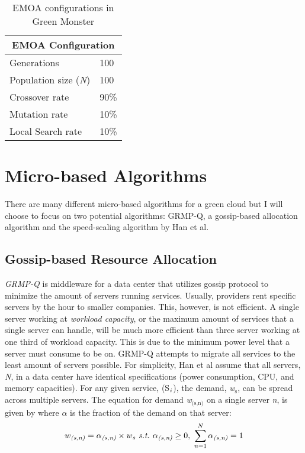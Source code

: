 \documentclass{sig-alternate}
\begin{document}
\begin{table}[tb]
\begin{center}
\begin{tabular}{|l|l|}
    \hline
    \multicolumn{2}{|c|}{\textbf{EMOA Configuration}} \\
    \hline
    Generations & 100 \\
    Population size (\emph{N}) & 100 \\
    Crossover rate & 90\% \\
    Mutation rate & 10\% \\
    Local Search rate & 10\% \\
    \hline
\end{tabular}
\caption{EMOA configurations in Green Monster}
\label{tab:EMOAConfig}
\end{center}
\end{table}



\section{Micro-based Algorithms} 
\label{sec:MicAl}

There are many different micro-based algorithms for a green cloud but I will choose to focus on two potential algorithms: GRMP-Q, a gossip-based allocation algorithm and the speed-scaling algorithm by Han et al. 

\subsection{Gossip-based Resource Allocation}
\label{sec:GBRA}
\emph{GRMP-Q} is middleware for a data center that utilizes gossip protocol to minimize the amount of servers running services. Usually, providers rent specific servers by the hour to smaller companies. This, however, is not efficient. A single server working at  \emph{workload capacity}, or the maximum amount of services that a single server can handle, will be much more efficient than three server working at one third of workload capacity. This is due to the minimum power level that a server must consume to be on. GRMP-Q attempts to migrate all services to the least amount of servers possible.  For simplicity, Han et al assume that all servers, \emph{N}, in a data center have identical specifications (power consumption, CPU, and memory capacities). For any given service, (S$_{\text{\emph{i}}}$), the demand, \emph{w$_{\text{s}}$}, can be spread across multiple servers. The equation for demand \emph{w$_{\text{(s,n)}}$} on a single server \emph{n}, is given by where \emph{$\alpha$} is the fraction of the demand on that server:
\[w_\emph{(s,n)} = \alpha_\emph{(s,n)} \times w_\emph{s} \text{\emph{~s.t.~}} \alpha_\emph{(s,n)} \geq 0,~ \sum_{n=1}^{N} \alpha_\emph{(s,n)} = 1  \]
\end{document}
